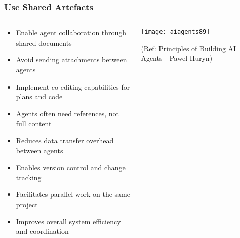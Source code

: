 \begin{frame}[fragile]\frametitle{Use Shared Artefacts}
\begin{columns}
    \begin{column}[T]{0.6\linewidth}
      \begin{itemize}
		\item Enable agent collaboration through shared documents
		\item Avoid sending attachments between agents
		\item Implement co-editing capabilities for plans and code
		\item Agents often need references, not full content
		\item Reduces data transfer overhead between agents
		\item Enables version control and change tracking
		\item Facilitates parallel work on the same project
		\item Improves overall system efficiency and coordination
	  \end{itemize}
    \end{column}
    \begin{column}[T]{0.4\linewidth}
		\begin{center}
		\texttt{[image: aiagents89]}
		
		{\tiny (Ref: Principles of Building AI Agents - Pawel Huryn)}
		\end{center}	
    \end{column}
  \end{columns}
\end{frame}

